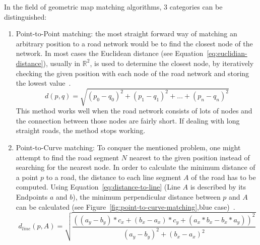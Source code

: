             In the field of geometric map matching algorithms, 3 categories can be distinguished:
            \begin{enumerate}
                \item Point-to-Point matching: the most straight forward way of matching an arbitrary position to a road network would be to find the closest node of the network.
                    In most cases the Euclidean distance (see Equation~\ref{eq:euclidian-distance}), usually in $\mathbb{R}^2$, is used to determine the closest node, by iteratively checking the given position with each node of the road network and storing the lowest value~\cite{bernstein1996introduction}.
                    \begin{equation}
                        d(p,q) = \sqrt{ (p_0 - q_0)^2 + (p_1 - q_1)^2  + \hdots  + (p_n - q_n)^2}
                        \label{eq:euclidian-distance}
                    \end{equation}
                    This method works well when the road network consists of lots of nodes and the connection between those nodes are fairly short.
                    If dealing with long straight roads, the method stops working.
                \item Point-to-Curve matching: To conquer the mentioned problem, one might attempt to find the road segment $N$ nearest to the given position instead of searching for the nearest node.
                    In order to calculate the minimum distance of a point $p$ to a road, the distance to each line segment $A$ of the road has to be computed.
                    Using Equation~\ref{eq:distance-to-line} (Line $A$ is described by its Endpoints $a$ and $b$), the minimum perpendicular distance between $p$ and $A$ can be calculated (see Figure~\ref{fig:point-to-curve-matching},blue case)~\cite{bernstein1996introduction}.
                    \begin{equation}
                        d_{line}(p,A) = \sqrt{\frac{((a_y-b_y)*c_x+(b_x-a_x)*c_y + (a_x*b_x - b_x*a_y))^2}{(a_y-b_y)^2 + (b_x-a_x)^2}}
                        \label{eq:distance-to-line}
                    \end{equation}


\end{enumerate}
